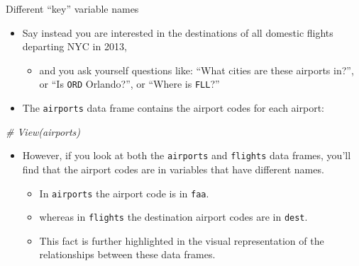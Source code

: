 \documentclass[
  ignorenonframetext,
]{beamer}
\newenvironment{Shaded}{\begin{snugshade}}{\end{snugshade}}
\newcommand{\CommentTok}[1]{\textcolor[rgb]{0.56,0.35,0.01}{\textit{#1}}}
\providecommand{\tightlist}{%
  \setlength{\itemsep}{0pt}\setlength{\parskip}{0pt}}
\begin{document}
\begin{frame}[fragile]{Different ``key'' variable names}
\label{different-key-variable-names}
\begin{itemize}
\item
  Say instead you are interested in the destinations of all domestic
  flights departing NYC in 2013,

  \begin{itemize}
  \tightlist
  \item
    and you ask yourself questions like: ``What cities are these
    airports in?'', or ``Is \texttt{ORD} Orlando?'', or ``Where is
    \texttt{FLL}?''
  \end{itemize}
\item
  The \texttt{airports} data frame contains the airport codes for each
  airport:
\end{itemize}

\normalsize

\begin{Shaded}
\begin{Highlighting}[]
\CommentTok{\# View(airports)}
\end{Highlighting}
\end{Shaded}

\normalsize

\begin{itemize}
\item
  However, if you look at both the \texttt{airports} and
  \texttt{flights} data frames, you'll find that the airport codes are
  in variables that have different names.

  \begin{itemize}
  \tightlist
  \item
    In \texttt{airports} the airport code is in \texttt{faa}.
  \item
    whereas in \texttt{flights} the destination airport codes are in
    \texttt{dest}.
  \item
    This fact is further highlighted in the visual representation of the
    relationships between these data frames.
  \end{itemize}
\end{itemize}
\end{frame}
\end{document}

